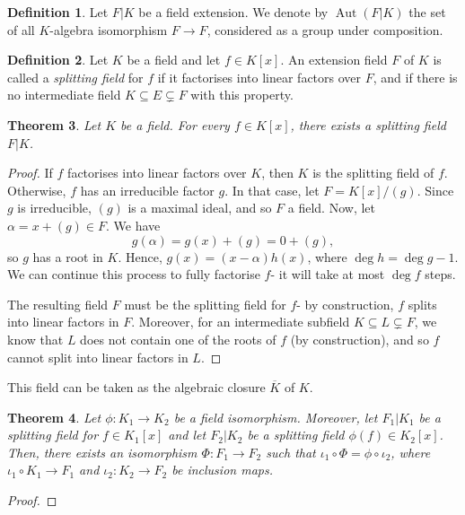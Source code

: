 \documentclass[a4paper, openany]{memoir}
\theoremstyle{definition}
\newtheorem{definition}{Definition}[section]
\theoremstyle{plain}
\newtheorem{theorem}[definition]{Theorem}
\begin{document}
    \begin{definition}
        Let $F|K$ be a field extension. We denote by $\operatorname{Aut}(F|K)$ the set of all $K$-algebra isomorphism $F \to F$, considered as a group under composition.
    \end{definition}

    \begin{definition}
        Let $K$ be a field and let $f \in K[x]$. An extension field $F$ of $K$ is called a \emph{splitting field} for $f$ if it factorises into linear factors over $F$, and if there is no intermediate field $K \subseteq E \subsetneq F$ with this property.
    \end{definition}

    \begin{theorem}
        Let $K$ be a field. For every $f \in K[x]$, there exists a splitting field $F|K$.
    \end{theorem}
    \begin{proof}
        If $f$ factorises into linear factors over $K$, then $K$ is the splitting field of $f$. Otherwise, $f$ has an irreducible factor $g$. In that case, let $F = K[x]/(g)$. Since $g$ is irreducible, $(g)$ is a maximal ideal, and so $F$ a field. Now, let $\alpha = x + (g) \in F$. We have
        \[g(\alpha) = g(x) + (g) = 0 + (g),\]
        so $g$ has a root in $K$. Hence, $g(x) = (x - \alpha)h(x)$, where $\deg h = \deg g - 1$. We can continue this process to fully factorise $f$- it will take at most $\deg f$ steps.

        The resulting field $F$ must be the splitting field for $f$- by construction, $f$ splits into linear factors in $F$. Moreover, for an intermediate subfield $K \subseteq L \subsetneq F$, we know that $L$ does not contain one of the roots of $f$ (by construction), and so $f$ cannot split into linear factors in $L$.
    \end{proof}
    \noindent This field can be taken as the algebraic closure $\overline{K}$ of $K$.

    \begin{theorem}
        Let $\phi \colon K_1 \to K_2$ be a field isomorphism. Moreover, let $F_1|K_1$ be a splitting field for $f \in K_1[x]$ and let $F_2|K_2$ be a splitting field $\phi(f) \in K_2[x]$. Then, there exists an isomorphism $\Phi \colon F_1 \to F_2$ such that $\iota_1 \circ \Phi = \phi \circ \iota_2$, where $\iota_1 \circ K_1 \to F_1$ and $\iota_2 \colon K_2 \to F_2$ be inclusion maps.
    \end{theorem}
    \begin{proof}

    \end{proof}
\end{document}
